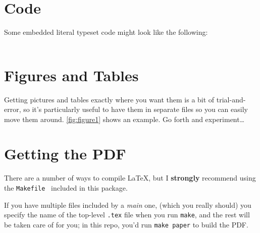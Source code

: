 \documentclass[letterpaper,twocolumn,10pt,final]{article}
\begin{document}
\section{\label{sec:code}Code}
Some embedded literal typeset code might look like the following:
\\ %
\texttt{
    \small
}


\section{\label{sec:ft}Figures and Tables}
Getting pictures and tables exactly where you want them is a bit of trial-and-error, so it's particularly useful to have them in separate files so you can easily move them around. \autoref{fig:figure1} shows an example. Go forth and experiment\ldots





\section{\label{sec:tex}Getting the PDF}
There are a number of ways to compile LaTeX, but I \textbf{strongly} recommend using the \texttt{Makefile}~\cite{latex-makefile} included in this package.

If you have multiple files included by a \textit{main} one, (which you really should) you specify the name of the top-level \texttt{.tex} file when you run \texttt{make}, and the rest will be taken care of for you; \eg in this repo, you'd run \texttt{make paper} to build the PDF.

{\footnotesize
    
    
}

\theendnotes
\end{document}
